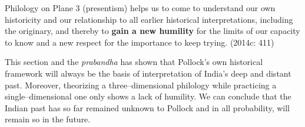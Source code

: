 \begin{myquote}
Philology on Plane 3 (presentism) helps us to come to understand our own historicity and our relationship to all earlier historical interpretations, including the originary, and thereby to \textbf{gain a new humility} for the limits of our capacity to know and a new respect for the importance to keep trying. (2014c: 411)
\end{myquote}

This section and the \textit{prabandha} has shown that Pollock’s own historical framework will always be the basis of interpretation of India’s deep and distant past. Moreover, theorizing a three–dimensional philology while practicing a single–dimensional one only shows a lack of humility. We can conclude that the Indian past has so far remained unknown to Pollock and in all probability, will remain so in the future.

